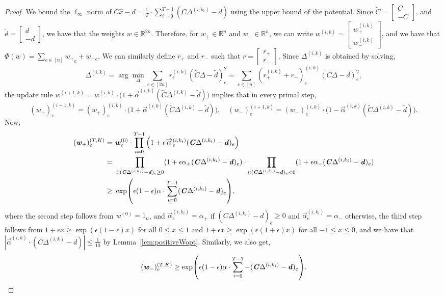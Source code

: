 \documentclass[11pt]{article}
\let\originalleft\left
\let\originalright\right
\renewcommand{\left}{\mathopen{}\mathclose\bgroup\originalleft}
\renewcommand{\right}{\aftergroup\egroup\originalright}
\newcommand\dd{\boldsymbol{\mathit{d}}}
\newcommand\rr{\boldsymbol{\mathit{r}}}
\newcommand\ww{\boldsymbol{\mathit{w}}}
\newcommand\xx{\boldsymbol{\mathit{x}}}
\newcommand\CC{\boldsymbol{\mathit{C}}}
\newcommand\xxhat{\widehat{\xx}}
\newcommand{\wt}{\widetilde}
\begin{document}
\begin{proof}
We bound the $\ell_{\infty}$ norm of $\CC \xxhat - \dd = \frac{1}{T} \cdot \sum_{i=0}^{T-1} (\CC \Delta^{(i,k_i)} - \dd)$ using the upper bound of the potential. Since $\wt{\CC} = \begin{bmatrix}
    \CC \\-\CC
\end{bmatrix}$, and $\wt{\dd}= \begin{bmatrix}
    \dd \\-\dd
\end{bmatrix}$, we have that the weights $\ww \in \mathbb{R}^{2n}$. Therefore, for $\ww_+\in \mathbb{R}^n$ and $\ww_{-}\in \mathbb{R}^n$, we can write $\ww^{(i,k)} = \begin{bmatrix}
    \ww_+^{(i,k)}\\ \ww_{-}^{(i,k)}
\end{bmatrix}$, and we have that $\Phi(\ww) = \sum_{e\in [n]}{\ww_+}_e + {\ww_{-}}_e$. We can similarly define $\rr_+$ and $\rr_{-}$ such that $\rr = \begin{bmatrix}
    \rr_+\\ \rr_{-}
\end{bmatrix}$. Since $\Delta^{(i,k)}$ is obtained by solving,
\[
\Delta^{(i,k)} = \arg\min_{\Delta}\sum_{e\in [2n]}\rr^{(i,k)}_e (\wt{\CC}\Delta-\wt{\dd})_e^2 = \sum_{e\in [n]}(\rr_+^{(i,k)} + \rr_{-})^{(i,k)}_e (\CC\Delta-\dd)_e^2, 
\]
the update rule $\ww^{(i+1,k)} = \ww^{(i,k)} \cdot \big(1 + \overrightarrow{\alpha}^{(i,k)} (\wt{\CC} \Delta^{(i,k)} - \wt{\dd})\big)$ implies that in every primal step,
\[
(\ww_+)_e^{(i+1,k)}=(\ww_+)_e^{(i,k)} \cdot \big(1 + \overrightarrow{\alpha}^{(i,k)} (\wt{\CC} \Delta^{(i,k)} - \wt{\dd})\big), \quad (\ww_-)_e^{(i+1,k)}=(\ww_-)_e^{(i,k)} \cdot \big(1 - \overrightarrow{\alpha}^{(i,k)} (\wt{\CC} \Delta^{(i,k)} - \wt{\dd})\big).
\]
Now,
\begin{align*}
(\ww_+)^{(T,K)}_e = &~ \ww^{(0)}_e \cdot \prod_{i=0}^{T-1} \Big(1 + \epsilon \overrightarrow{\alpha}^{(i,k_i)}_e (\CC \Delta^{(i,k_i)} - \dd)_e\Big) \\
= &~ \prod_{i: (\CC \Delta^{(i,k_i)} - \dd)_e \geq 0} (1 + \epsilon \alpha_+ (\CC \Delta^{(i,k_i)} - \dd)_e) \cdot \prod_{i: (\CC \Delta^{(i,k_i)} - \dd)_e < 0} (1 + \epsilon \alpha_- (\CC \Delta^{(i,k_i)} - \dd)_e) \\
\geq &~ \exp\left(\epsilon(1-\epsilon)\alpha \cdot \sum_{i=0}^{T-1} (\CC \Delta^{(i,k_i)} - \dd)_e\right),
\end{align*}
where the second step follows from $\ww^{(0)} = 1_n$, and $\overrightarrow{\alpha}_e^{(i,k_i)} = \alpha_+$ if $(\CC \Delta^{(i,k_i)} - \dd)_e \geq 0$ and $\overrightarrow{\alpha}_e^{(i,k_i)} = \alpha_-$ otherwise, the third step follows from $1 + \epsilon x \geq \exp(\epsilon (1-\epsilon) x)$ for all $0 \leq x \leq 1$ and $1 + \epsilon x \geq \exp(\epsilon (1 + \epsilon) x)$ for all $-1 \leq x \leq 0$, and we have that $|\overrightarrow{\alpha}^{(i,k)} \cdot (\CC \Delta^{(i,k)} - \dd)| \leq  \frac{1}{10}$ by Lemma~\ref{lem:positiveWopt}. Similarly, we also get,
\[
(\ww_{-})^{(T,K)}_e \geq \exp\left(\epsilon(1-\epsilon)\alpha \cdot \sum_{i=0}^{T-1} - (\CC \Delta^{(i,k_i)} - \dd)_e\right).
\]


\end{proof}
\end{document}
